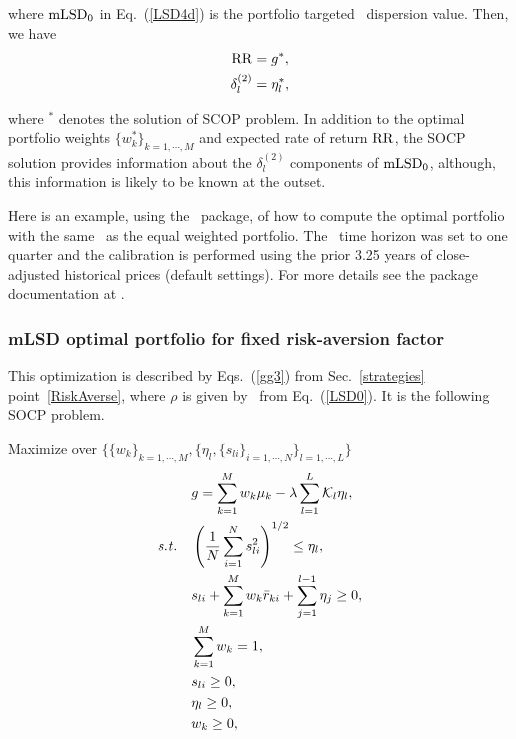 \noindent where ${\rm mLSD}_0$ in Eq.~(\ref{LSD4d}) is the portfolio targeted \mLSD\ dispersion value.
Then, we have
\begin{subequations}\label{LSD5}
\begin{align}
    \RR &= g^*, \label{LSD5a} \\
    \delta^{(2)}_l & = \eta_l^*, \label{LSD5b}
\end{align}
\end{subequations}

\noindent where $^*$ denotes the solution of SCOP problem.
In addition to the optimal portfolio weights $\{w_k^*\}_{k=1,\cdots,M}$ and expected rate of return ${\rm RR}$,
the SOCP solution provides information about the $\delta^{(2)}_l$ components of ${\rm mLSD}_0$,
although, this information is likely to be known at the outset.

\bigskip
\noindent Here is an example, using the \azapy\ package, of how to compute the optimal portfolio
with the same \mLSD\ as the equal weighted portfolio.
The \mLSD\ time horizon was set to one quarter and the calibration is performed using the prior 3.25 years of
close-adjusted historical prices (default settings).
For more details see the package documentation at \azapydoc.



\BackToContents

\subsubsection{mLSD optimal portfolio for fixed risk-aversion factor}
This optimization is described by Eqs.~(\ref{gg3}) from Sec.~\ref{strategies} point~\ref{RiskAverse},
where $\rho$ is given by \mLSD\ from Eq.~(\ref{LSD0}).
It is the following SOCP problem.

\bigskip
\noindent Maximize over $\{ \{w_k\}_{k=1,\cdots,M}, \{ \eta_l, \{ s_{li} \}_{i=1,\cdots,N} \}_{l=1,\cdots,L} \}$
\begin{subequations}\label{LSD6}
\begin{align}
    & g = \sum_{k=1}^M w_k\mu_k - \lambda \sum_{l=1}^L \cK_l \eta_l, \label{LSD6a} \\
    \st & \left( \frac{1}{N} \sum_{i=1}^N s_{li}^2 \right)^{1/2} \leq \eta_l, \label{LSD6b} \\
        & s_{li} + \sum_{k=1}^M w_k\br_{ki} + \sum_{j=1}^{l-1}\eta_j \geq 0, \label{LSD6c} \\
        &\sum_{k=1}^M w_k = 1, \label{LSD6d} \\
        & s_{li} \geq 0, \label{LSD6e} \\
        & \eta_l \geq 0, \label{LSD6g} \\
        & w_k \geq 0, \label{LSD6f}
\end{align}
\end{subequations}

